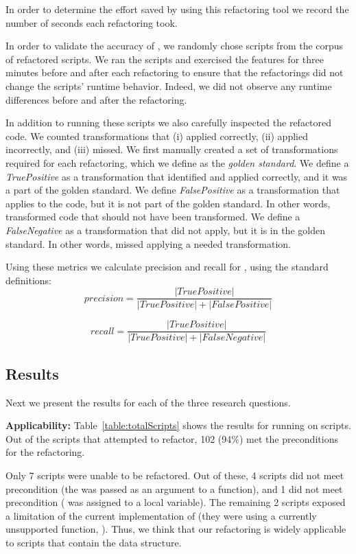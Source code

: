 \documentclass{sigplanconf}
\begin{document}
In order to determine the effort saved by using this refactoring tool we record the number of seconds each refactoring took. 



In order to validate the accuracy of \tool, we randomly chose \numManual scripts from the corpus of \numScripts refactored scripts. We ran the scripts and exercised the features for three minutes before and after each refactoring to ensure that the refactorings did not change the scripts' runtime behavior. Indeed, we did not observe any runtime differences before and after the refactoring. 

In addition to running these \numManual scripts we also carefully inspected the refactored code. We counted transformations that \tool
(i) applied correctly, (ii) applied incorrectly, and (iii) missed. We first manually created a set of transformations required for each refactoring, which we define as the \emph{golden standard}. We define a {\it TruePositive} as a transformation that \tool identified and applied correctly, and it was a part of the golden standard. 
We define {\it FalsePositive} as a transformation that \tool applies to the code, but it is not part of the golden standard. In other words, \tool transformed code that should not have been transformed.
We define a {\it FalseNegative} as a transformation that \tool did not apply, but it is in the golden standard. In other words, \tool missed applying a needed transformation.
 
 Using these metrics we calculate precision and recall for \tool, using the standard definitions:
\[precision = \frac{|True Positive|}{|True Positive|+|False Positive|}\]

\[recall = \frac{|True Positive|}{|True Positive|+|False Negative|}\]



\subsection{Results}

Next we present the results for each of the three research questions.


\textbf{Applicability: } 
Table~\ref{table:totalScripts} shows the results for running \tool on \numScripts scripts. 
Out of the \numScripts scripts that \tool attempted to refactor, 102 (94\%) met the preconditions for the refactoring.

Only 7 scripts were unable to be refactored. Out of these, 4 scripts did not meet precondition \POne (the \NC{} was passed as an argument to a function), and 1 did not meet precondition \PTwo (\NC{} was assigned to a local variable). The remaining 2 scripts exposed a limitation of the current implementation of \tool (they were using a currently unsupported function, ). 
Thus, we think that our refactoring is widely applicable to \TD scripts that contain the \NC{} data structure.  
\end{document}
